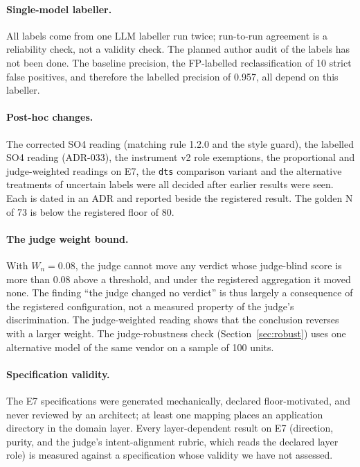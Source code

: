 \documentclass[10pt,a4paper]{article}
\begin{document}
\paragraph{Single-model labeller.}
All labels come from one LLM labeller run twice; run-to-run agreement is a reliability check, not a validity check.
The planned author audit of the labels has not been done. The baseline precision, the FP-labelled reclassification of
10 strict false positives, and therefore the labelled precision of 0.957, all depend on this labeller.

\paragraph{Post-hoc changes.}
The corrected SO4 reading (matching rule 1.2.0 and the style guard), the labelled SO4 reading (ADR-033), the
instrument v2 role exemptions, the
proportional and judge-weighted readings on E7, the \texttt{dts} comparison variant and the alternative treatments of
uncertain labels were all decided after earlier results were seen. Each is dated in an ADR and reported beside the
registered result. The golden N of 73 is below the registered floor of 80.

\paragraph{The judge weight bound.}
With $W_n = 0.08$, the judge cannot move any verdict whose judge-blind score is more than 0.08 above a threshold, and
under the registered aggregation it moved none. The finding ``the judge changed no verdict'' is thus largely a
consequence of the registered configuration, not a measured property of the judge's discrimination. The
judge-weighted reading shows that the conclusion reverses with a larger weight. The judge-robustness check
(Section~\ref{sec:robust}) uses one alternative model of the same vendor on a sample of 100 units.

\paragraph{Specification validity.}
The E7 specifications were generated mechanically, declared floor-motivated, and never reviewed by an architect;
at least one mapping places an application directory in the domain layer. Every layer-dependent result on E7
(direction, purity, and the judge's intent-alignment rubric, which reads the declared layer role) is measured
against a specification whose validity we have not assessed.
\end{document}
